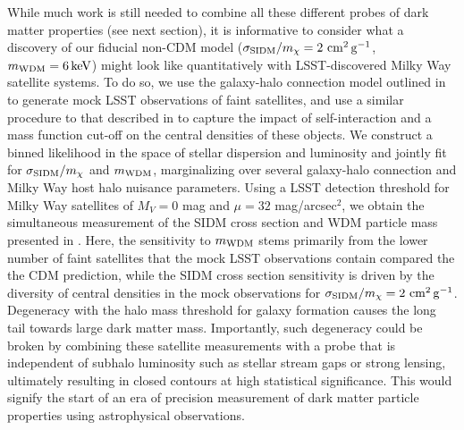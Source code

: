 While much work is still needed to combine all these different probes of dark matter properties (see next section), it is informative to consider what a discovery of our fiducial non-CDM model ($\sigma_{\rm SIDM}/m_\chi = 2 \mathrm{\,\mathrm{\,cm}^2\mathrm{\,g}^{-1}}$, $m_{\rm WDM} = 6 \mathrm{\,keV}$) might look like quantitatively with LSST-discovered Milky Way satellite systems. To do so, we use the galaxy-halo connection model outlined in \citet{Nadler:2018} to generate mock LSST observations of faint satellites, and use a similar procedure to that described in  to capture the impact of self-interaction and a mass function cut-off on the central densities of these objects. We construct a binned likelihood in the space of stellar dispersion and luminosity and jointly fit for $\sigma_{\rm SIDM}/m_\chi$ and $m_{\rm WDM}$, marginalizing over several galaxy-halo connection and Milky Way host halo nuisance parameters. Using a LSST detection threshold for Milky Way satellites of $M_V = 0$ mag and $\mu=32$ mag/arcsec$^2$, we obtain the simultaneous measurement of the SIDM cross section and WDM particle mass presented in . Here, the sensitivity to $m_{\rm WDM}$ stems primarily from the lower number of faint satellites that the mock LSST observations contain compared the the CDM prediction, while the SIDM cross section sensitivity is driven by the diversity of central densities in the mock observations for $\sigma_{\rm SIDM}/m_\chi = 2 \mathrm{\,\mathrm{\,cm}^2\mathrm{\,g}^{-1}}$. Degeneracy with the halo mass threshold for galaxy formation causes the long tail towards large dark matter mass. Importantly, such degeneracy could be broken by combining these satellite measurements with a probe that is independent of subhalo luminosity such as stellar stream gaps or strong lensing, ultimately resulting in closed contours at high statistical significance. This would signify the start of an era of precision measurement of dark matter particle properties using astrophysical observations.

